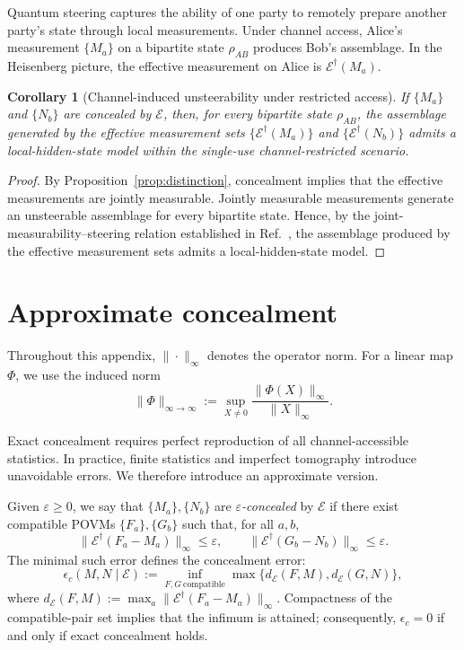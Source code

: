 \documentclass[
aps,pra,twocolumn,10pt,
superscriptaddress,longbibliography,floatfix
]{revtex4-2}
\newtheorem{corollary}[theorem]{Corollary}
\begin{document}
Quantum steering \cite{Wiseman2007} captures the ability of one party to remotely prepare another party's state through local measurements. Under channel access, Alice's measurement $\{M_a\}$ on a bipartite state $\rho_{AB}$ produces Bob's assemblage. In the Heisenberg picture, the effective measurement on Alice is $\mathcal E^\dagger(M_a)$.

\begin{corollary}[Channel-induced unsteerability under restricted access]
If $\{M_a\}$ and $\{N_b\}$ are concealed by $\mathcal E$, then, for every bipartite state $\rho_{AB}$, the assemblage generated by the effective measurement sets
$\{\mathcal E^\dagger(M_a)\}$ and
$\{\mathcal E^\dagger(N_b)\}$
admits a local-hidden-state model within the single-use channel-restricted scenario.
\end{corollary}

\begin{proof}
By Proposition~\ref{prop:distinction}, concealment implies that the effective measurements are jointly measurable. Jointly measurable measurements generate an unsteerable assemblage for every bipartite state. Hence, by the joint-measurability--steering relation established in Ref.~\cite{Uola2015}, the assemblage produced by the effective measurement sets admits a local-hidden-state model.
\end{proof}

\section{Approximate concealment}
\label{app:approx}

Throughout this appendix, $\|\cdot\|_\infty$ denotes the operator norm. For a linear map $\Phi$, we use the induced norm
\[
\|\Phi\|_{\infty\to\infty}
:=
\sup_{X\ne0}
\frac{\|\Phi(X)\|_\infty}{\|X\|_\infty}.
\]

Exact concealment requires perfect reproduction of all channel-accessible statistics. In practice, finite statistics and imperfect tomography introduce unavoidable errors. We therefore introduce an approximate version.

Given $\varepsilon \ge 0$, we say that $\{M_a\},\{N_b\}$ are \emph{$\varepsilon$-concealed} by $\mathcal{E}$ if there exist compatible POVMs $\{F_a\},\{G_b\}$ such that, for all $a,b$,
\[
\|\mathcal{E}^\dagger(F_a-M_a)\|_\infty \le \varepsilon,\qquad
\|\mathcal{E}^\dagger(G_b-N_b)\|_\infty \le \varepsilon.
\]
The minimal such error defines the concealment error:
\[
\epsilon_c(M,N\mid\mathcal E)
:=\inf_{F,G\ \mathrm{compatible}}
\max\{d_{\mathcal E}(F,M),d_{\mathcal E}(G,N)\},
\]
where $d_{\mathcal E}(F,M):=\max_a\|\mathcal E^\dagger(F_a-M_a)\|_\infty$. Compactness of the compatible-pair set implies that the infimum is attained; consequently, $\epsilon_c=0$ if and only if exact concealment holds.
\end{document}
